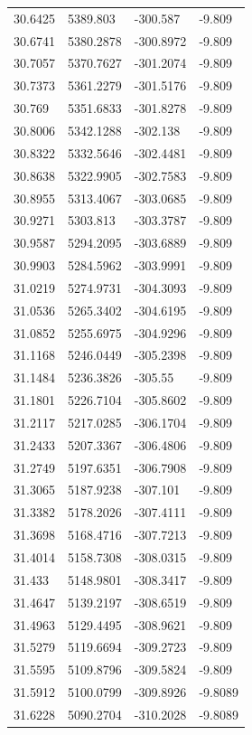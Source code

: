 \begin{table}[H]
\begin{tabular}{llll}
30.6425 & 5389.803 & -300.587 & -9.809 \\
30.6741 & 5380.2878 & -300.8972 & -9.809 \\
30.7057 & 5370.7627 & -301.2074 & -9.809 \\
30.7373 & 5361.2279 & -301.5176 & -9.809 \\
30.769 & 5351.6833 & -301.8278 & -9.809 \\
30.8006 & 5342.1288 & -302.138 & -9.809 \\
30.8322 & 5332.5646 & -302.4481 & -9.809 \\
30.8638 & 5322.9905 & -302.7583 & -9.809 \\
30.8955 & 5313.4067 & -303.0685 & -9.809 \\
30.9271 & 5303.813 & -303.3787 & -9.809 \\
30.9587 & 5294.2095 & -303.6889 & -9.809 \\
30.9903 & 5284.5962 & -303.9991 & -9.809 \\
31.0219 & 5274.9731 & -304.3093 & -9.809 \\
31.0536 & 5265.3402 & -304.6195 & -9.809 \\
31.0852 & 5255.6975 & -304.9296 & -9.809 \\
31.1168 & 5246.0449 & -305.2398 & -9.809 \\
31.1484 & 5236.3826 & -305.55 & -9.809 \\
31.1801 & 5226.7104 & -305.8602 & -9.809 \\
31.2117 & 5217.0285 & -306.1704 & -9.809 \\
31.2433 & 5207.3367 & -306.4806 & -9.809 \\
31.2749 & 5197.6351 & -306.7908 & -9.809 \\
31.3065 & 5187.9238 & -307.101 & -9.809 \\
31.3382 & 5178.2026 & -307.4111 & -9.809 \\
31.3698 & 5168.4716 & -307.7213 & -9.809 \\
31.4014 & 5158.7308 & -308.0315 & -9.809 \\
31.433 & 5148.9801 & -308.3417 & -9.809 \\
31.4647 & 5139.2197 & -308.6519 & -9.809 \\
31.4963 & 5129.4495 & -308.9621 & -9.809 \\
31.5279 & 5119.6694 & -309.2723 & -9.809 \\
31.5595 & 5109.8796 & -309.5824 & -9.809 \\
31.5912 & 5100.0799 & -309.8926 & -9.8089 \\
31.6228 & 5090.2704 & -310.2028 & -9.8089 \\

\end{tabular}
\end{table}
